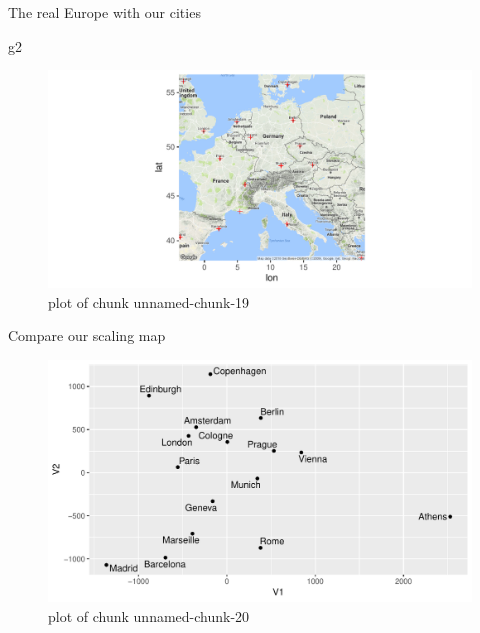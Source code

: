 \documentclass[ignorenonframetext,]{beamer}
\newenvironment{Shaded}{\begin{snugshade}}{\end{snugshade}}
\newcommand{\NormalTok}[1]{#1}
\begin{document}
\begin{frame}[fragile]{The real Europe with our cities}
\protect\hypertarget{the-real-europe-with-our-cities}{}

\begin{Shaded}
\begin{Highlighting}[]
\NormalTok{g2}
\end{Highlighting}
\end{Shaded}

\begin{figure}
\centering
\includegraphics{figure/unnamed-chunk-19-1.pdf}
\caption{plot of chunk unnamed-chunk-19}
\end{figure}

\end{frame}

\begin{frame}{Compare our scaling map}
\protect\hypertarget{compare-our-scaling-map}{}

\begin{figure}
\centering
\includegraphics{figure/unnamed-chunk-20-1.pdf}
\caption{plot of chunk unnamed-chunk-20}
\end{figure}

\end{frame}
\end{document}
